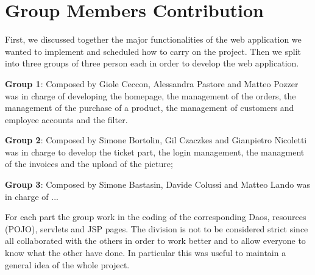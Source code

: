 \section{Group Members Contribution}

First, we discussed together the major functionalities of the web application we wanted to implement and scheduled how to carry on the project.
Then we split into three groups of three person each in order to develop the web application.


\begin{description}
	\item \textbf{Group 1}: Composed by Giole Ceccon, Alessandra Pastore and Matteo Pozzer was in charge of developing the homepage, the management of the orders, the management of the purchase of a product, the management of customers and employee accounts and the filter.
	\item \textbf{Group 2}: Composed by Simone Bortolin, Gil Czaczkes and Gianpietro Nicoletti was in charge to develop the ticket part, the login management, the managment of the invoices and the upload of the picture;
	\item \textbf{Group 3}: Composed by Simone Bastasin, Davide Colussi and Matteo Lando was in charge of ...

For each part the group work in the coding of the corresponding Daos, resources (POJO), servlets and JSP pages.
The division is not to be considered strict since all collaborated with the others in order to work better and to allow everyone to know what the other have done. In particular this was useful to maintain a general idea of the whole project.

\end{description}